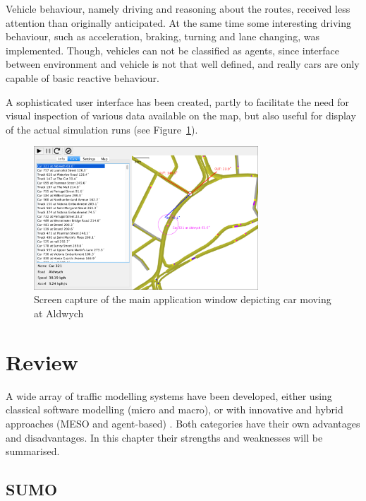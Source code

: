 Vehicle behaviour, namely driving and reasoning about the routes, received less attention than originally anticipated. At the same time some interesting driving behaviour, such as acceleration, braking, turning and lane changing, was implemented. Though, vehicles can not be classified as agents, since interface between environment and vehicle is not that well defined, and really cars are only capable of basic reactive behaviour.

A sophisticated user interface has been created, partly to facilitate the need for visual inspection of various data available on the map, but also useful for display of the actual simulation runs (see Figure~\ref{fig:screenshot}).

\begin{figure}[H]
    \vspace{1.5em}
    \caption{Screen capture of the main application window depicting car moving at Aldwych}
    \label{fig:screenshot}
    \centering
    \includegraphics[width=0.75\textwidth]{figs/mainWindowWithStrand.png}
    \vspace{1.5em}
\end{figure}

\section{Review}

A wide array of traffic modelling systems have been developed, either using classical software modelling (micro and macro), or with innovative and hybrid approaches (MESO and agent-based) \cite{Hawick2009}. Both categories have their own advantages and disadvantages. In this chapter their strengths and weaknesses will be summarised.

\subsection{SUMO}

